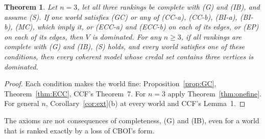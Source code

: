 \documentclass[11pt]{article}
\newtheorem{theorem}{Theorem}
\theoremstyle{definition}\newtheorem{definition}[theorem]{Definition}
\theoremstyle{remark}\newtheorem{remark}[theorem]{Remark}
\begin{document}
\begin{theorem}\label{thm:arch}
Let $n=3$, let all three rankings be complete with (G) and (IB), and assume
(S). If one world satisfies (GC) or any of (CC-a), (CC-b), (BI-a),
(BI-b), (MC), which imply it, or (ECC-a) and (ECC-b) on each of its edges, or (EP) on each
of its edges, then $V$ is dominated. For any $n\ge3$, if all rankings are
complete with (G) and (IB), (S) holds, and every world satisfies one of these
conditions, then every coherent model whose credal set contains three
vertices is dominated.
\end{theorem}
\begin{proof}
Each condition makes the world fine: Proposition~\ref{prop:GC},
Theorem~\ref{thm:ECC}, CCF's Theorem~7. For $n=3$ apply
Theorem~\ref{thm:onefine}. For general $n$, Corollary~\ref{cor:ext}(b) at
every world and CCF's Lemma~1.
\end{proof}

The axioms are not consequences of completeness, (G) and (IB), even for a
world that is ranked exactly by a loss of CBOI's form.
\end{document}
